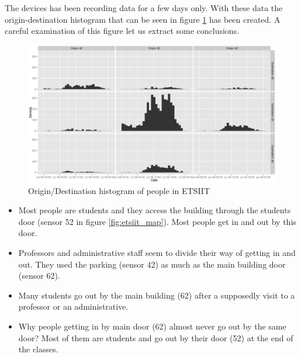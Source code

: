 \documentclass[preprint]{elsarticle}
\begin{document}
The devices has been recording data for a few days only. With these data the origin-destination histogram that can be seen in figure \ref{fig:etsiit_io} has been created. A careful examination of this figure let us extract some conclusions.

\begin{figure}[!ht]
	\begin{center}
		\includegraphics[width=\textwidth]{imgs/ETSIIT/etsiit_graph_origin-destination-histogram.eps}
		\caption{Origin/Destination histogram of people in ETSIIT}
		\label{fig:etsiit_io}
	\end{center}
\end{figure}

\begin{itemize}
\item Most people are students and they access the building through the students door (sensor 52 in figure \ref{fig:etsiit_map}). Most people get in and out by this door.
\item Professors and administrative staff seem to divide their way of getting in and out. They used the parking (sensor 42) as much as the main building door (sensor 62).
\item Many students go out by the main building (62) after a supposedly visit to a professor or an administrative.
\item Why people getting in by main door (62) almost never go out by the same door? Most of them are students and go out by their door (52) at the end of the classes.
\end{itemize}
\end{document}
